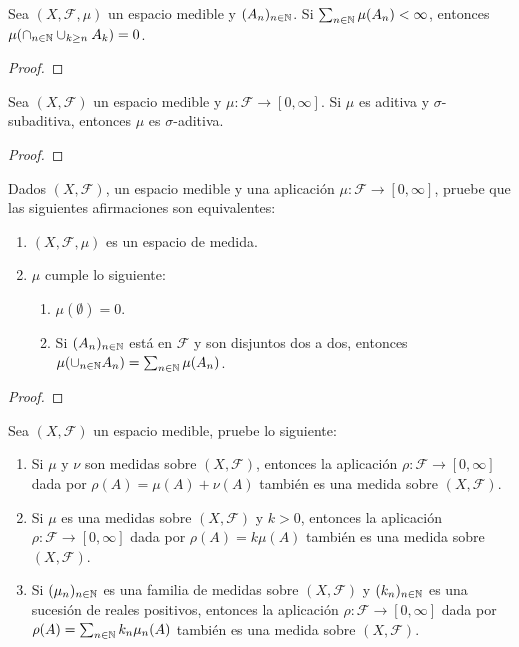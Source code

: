 \begin{statement}{8}
  Sea $(X, \mathcal{F}, \mu)$ un espacio medible y $(A_n)_{n \in \mathbb N}$. Si $\sum_{n \in \mathbb N} \mu(A_n) < \infty$, entonces $\mu(\cap_{n \in \mathbb N} \cup_{k \geq n} A_k) = 0$.
\end{statement}

\begin{proof}
\end{proof}

\begin{statement}{9}
  Sea $(X, \mathcal{F})$ un espacio medible y $\mu: \mathcal{F} \to [0, \infty]$. Si $\mu$ es aditiva y $\sigma$-subaditiva, entonces $\mu$ es $\sigma$-aditiva.
\end{statement}

\begin{proof}
\end{proof}

\begin{statement}{10}
  Dados $(X, \mathcal{F})$, un espacio medible y una aplicaci\'on $\mu: \mathcal{F} \to [0, \infty]$, pruebe que las siguientes afirmaciones son equivalentes:
  \begin{enumerate}
    \item $(X, \mathcal{F}, \mu)$ es un espacio de medida.
    \item $\mu$ cumple lo siguiente:
      \begin{enumerate}
        \item $\mu(\emptyset) = 0$.
        \item Si $(A_n)_{n \in \mathbb N}$ est\'a en $\mathcal{F}$ y son disjuntos dos a dos, entonces $\mu(\cup_{n \in \mathbb N} A_n) = \sum_{n \in \mathbb N} \mu(A_n)$.
      \end{enumerate}
  \end{enumerate}
\end{statement}

\begin{proof}
\end{proof}

\begin{statement}{11}
  Sea $(X, \mathcal{F})$ un espacio medible, pruebe lo siguiente:
  \begin{enumerate}
    \item Si $\mu$ y $\nu$ son medidas sobre $(X, \mathcal{F})$, entonces la aplicaci\'on $\rho: \mathcal{F} \to [0, \infty]$ dada por $\rho(A) = \mu(A) + \nu(A)$ tambi\'en es una medida sobre $(X, \mathcal{F})$.
    \item Si $\mu$ es una medidas sobre $(X, \mathcal{F})$ y $k > 0$, entonces la aplicaci\'on $\rho: \mathcal{F} \to [0, \infty]$ dada por $\rho(A) = k \mu(A)$ tambi\'en es una medida sobre $(X, \mathcal{F})$.
    \item Si $(\mu_n)_{n \in \mathbb N}$ es una familia de medidas sobre $(X, \mathcal{F})$ y $(k_n)_{n \in \mathbb N}$ es una sucesi\'on de reales positivos, entonces la aplicaci\'on $\rho: \mathcal{F} \to [0, \infty]$ dada por $\rho(A) = \sum_{n \in \mathbb N} k_n \mu_n(A)$ tambi\'en es una medida sobre $(X, \mathcal{F})$.
  \end{enumerate}
\end{statement}

